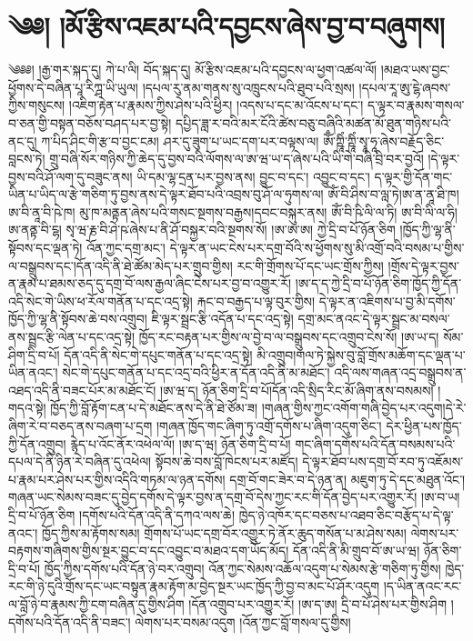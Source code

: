 \chapter{༄༅། །མོ་རྩིས་འཇམ་པའི་དབྱངས་ཞེས་བྱ་བ་བཞུགས།}༄༅༅། །རྒྱ་གར་སྐད་དུ། ཀེ་པ་ལི། བོད་སྐད་དུ། མོ་རྩིས་འཇམ་པའི་དབྱངས་ལ་ཕྱག་འཚལ་ལོ། །མཐའ་ཡས་བྱང་ཕྱོགས་དེ་བཞིན་པཱ་རིཀྴ་ཡི་ཡུལ། །དཔལ་རུ་ནམ་གནས་སུ་འཁྲུངས་པའི་ཐུབ་པའི་སྲས། །དཔལ་རཱ་ཨུ་ངྷེ་ཞབས་ཀྱིས་གསུངས། །འཇིག་རྟེན་པ་རྣམས་ཀྱིས་ཤེས་པའི་ཕྱིར། །འདས་པ་དང་མ་འོངས་པ་དང་། ད་ལྟར་བ་རྣམས་གསལ་བ་ཅན་གྱི་བསྟན་བཅོས་བཤད་པར་བྱ་སྟེ། དཔྱིད་ཟླ་ར་བའི་མར་ངོའི་ཚེས་བཅུ་བཞིའི་མཚན་མོ་ཐུན་གཉིས་པའི་ནང་དུ། ཀ་པིད་ཤིང་གི་རྩ་བ་བྱང་ངམ། ཤར་དུ་ཟུག་པ་ཡང་དག་པར་བལྟས་ལ། ཨོྃ་ཀྵཱིཾ་ཀྵཱིཾ་སྭཱ་ཧཱ་ཞེས་བརྗོད་ཅིང་བླངས་ཏེ། གྲུ་བཞི་སོར་གཉིས་ཀྱི་ཆེད་དུ་བྱས་བའི་ལོགས་ལ་ཨ་ཝ་ཡ་ད་ཞེས་པའི་ཡི་གེ་བཞི་བྲི་བར་བྱའོ། །དེ་ལྟར་བྱས་བའི་ཤོ་ལག་དུ་བཟུང་ནས། ཡི་དམ་ལྷ་དྲན་པར་བྱས་ནས། བྱུང་བ་དང་། འབྱུང་བ་དང་། ད་ལྟར་གྱི་དོན་གང་ཡིན་པ་ཡིད་ལ་རྩེ་གཅིག་ཏུ་བྱས་ནས་དེ་ལྟར་ཐོབ་པའི་འབྲས་བུ་ཤོ་ལ་ཧུགས་ལ། ཨོཾ་བི་ཤིས་བ་ལླ་ཏེ།ཨ་ན་ནཱ་ཐི་ཁ། ཨ་བི་ནཱ་བི་ཥེ་ཁ། མུ་ཁ་མནྟན་ཞེས་པའི་གསང་སྔགས་བརྒྱས།དབང་བསྐུར་ནས། ཨོཾ་བི་ཥི་ལི་ལ་ཏི། ཨ་བི་ལི་ལ་ཧི། ཨ་ནནྟ་བི་ངྷ། སྭ་ཝ་རྞ་བི་ཤེ་ཥ་ཞེས་པ་ནི་ཤོ་བསྐྱར་བའི་སྔགས་སོ། །ཨ་ཨ་ཨ། ཀྱེ་དྲི་བ་པོ་ཉོན་ཅིག །ཁྱོད་ཀྱི་ལྷ་ནི་སྟོབས་དང་ལྡན་ཏེ། འོན་ཀྱང་དགྲ་མང་། དེ་ལྟར་ན་ཡང་ངེས་པར་དགྲ་བོའི་ས་ཕྱོགས་སུ་མི་འགྲོ་བའི་བསམ་པ་གྱིས་ལ་བསྒྲུབས་དང་།དོན་འདི་ནི་ཐེ་ཚོམ་མེད་པར་གྲུབ་གྱིས། རང་གི་གྲོགས་པོ་དང་ཡང་གྲོས་ཀྱིས། །གྲོས་དེ་ལྟར་བྱས་ན་རྣམ་པ་ཐམས་ཅད་དུ་དགྲ་བོ་ལས་རྒྱལ་ཞིང་ངེས་པར་བྱ་བ་འགྱུར་རོ། །ཨ་ད་ད་ཀྱེ་དྲི་བ་པོ་ཉོན་ཅིག་ཁྱོད་ཀྱི་དོན་འདི་སེང་གེ་ཡིས་ཕ་རོལ་གནོན་པ་དང་འདྲ་སྟེ། རྐང་བ་བརྒྱད་པ་ལྟ་བུར་གྱིས། དེ་ལྟར་ན་འཇིགས་པ་བྱ་མི་དགོས་ཁྱོད་ཀྱི་ལྷ་ནི་སྟོབས་ཆེ་བས་འགྲུབ། ཇི་ལྟར་སྦྲང་རྩི་འདོན་པ་དང་འདྲ་སྟེ། དགྲ་མང་ནའང་དེ་ལྟར་སྦྲང་མ་བསལ་ནས་སྦྲང་རྩི་ལེན་པ་དང་འདྲ་སྟེ། ཁྱོད་རང་བརྟན་པར་གྱིས་ལ་བྱེ་བ་ལ་བསྒྲུབས་དང་འགྲུབ་ངེས་སོ། །ཨ་ཡ་ད། སོམ་ཤིག་དྲི་བ་པོ། དོན་འདི་ནི་སེང་གེ་དཔུང་གནོན་པ་དང་འདྲ་སྟེ། མི་འགྲུབ།གལ་ཏེ་སྐྱེས་བུ་བློ་གྲོས་མཆོག་དང་ལྡན་པ་ཡིན་ནའང་། སེང་གེ་དཔུང་གནོན་པ་དང་འདྲ་བའི་ཕྱིར་ན་དོན་འདི་ནི་མ་མཐོང་། འདི་ལས་གཞན་འདྲ་བསྒྲུབས་ན་འཐད་འདི་ནི་བཟང་པོར་མ་མཐོང་ངོ། །ཨ་ཝ་ད། ཉོན་ཅིག་དྲི་བ་པོ།དོན་འདི་སྲིད་རིང་མོ་ཞིག་ནས་བསམས། །གདའ་སྟེ། ཁྱོད་ཀྱི་བློ་རྟོག་ངན་པ་དེ་མཐོང་ནས་དེ་ནི་ཐེ་ཙོམ་ཟ། །གཞན་གྱིས་ཀྱང་འགོག་གཞི་བྱེད་པར་འདུག།དེ་རེ་ཞིག་རེ་བ་བཅད་ནས་བཞག་པ་དྲག །གཞན་ཁྱོད་གང་ཞིག་ཏུ་འགྲོ་དགོས་པ་ཞིག་འདུག་ཅིང་། དེར་ཕྱིན་པས་ཁྱོད་ཀྱི་དོན་འགྲུབ། རྙེད་པ་འོང་ནོར་འཕེལ་ལོ། །ཨ་ད་ཝ། ཉོན་ཅིག་དྲི་བ་པོ། གང་ཞིག་དགོས་པའི་དོན་བསམས་པའི་དཔལ་དེ་ནི་ཉིན་རེ་བཞིན་དུ་འཕེལ། སྟོབས་ཆེ་བས་བློ་ཁེངས་པར་མཛོད། དེ་ལྟར་ཐོབ་པས་དགྲ་བོ་རབ་ཏུ་འཇོམས་པ་རྣམ་པར་ཤེས་པར་གྱིས་འདིའི་གཏམ་ལ་ཉན་དགོས། དགྲ་བོ་གང་ཟེར་བ་དེ་ཉན་ན། མཇུག་ཏུ་དེ་དང་མཐུན་འོང་། གཞན་ཡང་སེམས་བཟང་དུ་བྱེད་དགོས་དེ་ལྟར་བྱས་ན་དགྲ་བོ་དེས་ཀྱང་རང་གི་དོན་བྱེད་པར་འགྱུར་རོ། །ཨ་བ་ཡ། དྲི་བ་པོ་ཉོན་ཅིག །དགོས་པའི་དོན་འདི་ནི་དཀའ་ལས་ཆེ། ཁྱེད་ཉེ་འཁོར་དང་བཅས་པ་འཐབ་ཅིང་བརྩོད་པ་དེ་ལྟ་ནའང་། ཁྱོད་ཀྱིས་མ་རྟོགས་སམ། གྲོགས་པོ་ཡང་དགྲ་བོར་འགྱུར་ཏེ་ནོར་ཆུད་གསོན་པ་མ་ཤེས་སམ། ལེགས་པར་བརྟགས་གཞིགས་གྱིས་སྔར་བྱུང་བ་དང་འབྱུང་བ་མཐའ་དག་ཡོད་མོད། དོན་འདི་ནི་མི་གྲུབ་བོ་ཨ་ཡ་ཝ། ཉོན་ཅིག་དྲི་བ་པོ། ཁྱོད་ཀྱིས་དགོས་པའི་དོན་ཉེ་བར་འགྲུབ། འོན་ཀྱང་སེམས་འཆོལ་འདུག་པ་སེམས་རྩེ་གཅིག་ཏུ་གྱིས། ཁྱེད་རང་གི་ཉེ་དུའི་གྲོས་དང་ཡང་བསྟུན་རྣམ་རྟོག་མ་བྱེད་སྔར་ཡང་ཁྱོད་ཀྱི་བྱ་བ་མང་པོ་ཤོར་འདུག །ད་ཡིན་ནའང་རང་ལ་བློ་ཉེ་བ་རྣམས་ཀྱི་ངག་བཞིན་དུ་གྱིས་ཤིག །དོན་འགྲུབ་པར་འགྱུར་རོ། །ཨ་ད་ཨ། དྲི་བ་པོ་ཤེས་པར་གྱིས་ཤིག །དགོས་པའི་དོན་འདི་ནི་བཟང་། ལེགས་པར་བསམ་འདུག །འོན་ཀྱང་བློ་གསལ་དུ་གྱིས། 